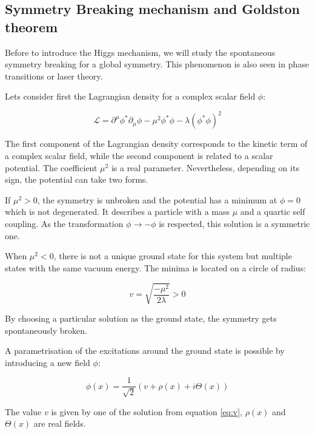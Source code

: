      \subsection{Symmetry Breaking mechanism and Goldston theorem}
    
    Before to introduce the Higgs mechanism, we will study the spontaneous symmetry breaking for a global symmetry.
    This phenomenon is also seen in phase transitions or laser theory.

    Lets consider first the Lagrangian density for a complex scalar field $\phi$:

    \begin{equation}
      \mathcal{L} = \partial^{\mu}\phi^{*} \partial_{\mu}\phi - \mu^2\phi^{*}\phi - \lambda (\phi^{*}\phi)^2
      \label{eq:ssbLagrangian}
    \end{equation}

    The first component of the Lagrangian density corresponds to the kinetic term of a complex scalar field, while the second component is related to a scalar potential.
    The coefficient $\mu^2$ is a real parameter. Nevertheless, depending on its sign, the potential can take two forms.

    If $\mu^{2} > 0$, the symmetry is unbroken and the potential has a minimum at $\phi = 0$ which is not degenerated.
    It describes a particle with a mass $\mu$ and a quartic self coupling.
    As the transformation $\phi \rightarrow  - \phi$ is respected, this solution is a symmetric one.

    When $\mu^{2} < 0$, there is not a unique ground state for this system but multiple states with the same vacuum energy.
    The minima is located on a circle of radius:

    \begin{equation}
      v = \sqrt{\frac{- \mu^2}{2\lambda}} > 0
      \label{eq:v}
    \end{equation}

    By choosing a particular solution as the ground state, the symmetry gets spontaneously broken.

    A parametrisation of the excitations around the ground state is possible by introducing a new field $\phi$:

    \begin{equation}
      \phi(x) = \frac{1}{\sqrt{2}} \left( v + \rho(x) + i\Theta(x) \right)
    \end{equation}

    The value $v$ is given by one of the solution from equation \ref{eq:v}, $\rho(x)$ and $\Theta(x)$ are real fields.

